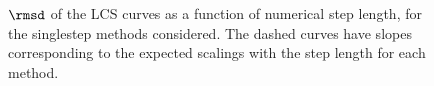 \begin{figure}[htpb]
    \centering
    
    \caption[$\rmsd$ of the LCS curves as a function of numerical step length,
                for the singlestep methods considered]
                {$\rmsd$ of the LCS curves as a function of numerical step
                length, for the singlestep methods considered. The dashed curves
                have slopes corresponding to the expected scalings with the step
            length for each method.}
    \label{fig:lcs_err_fixed}
\end{figure}
